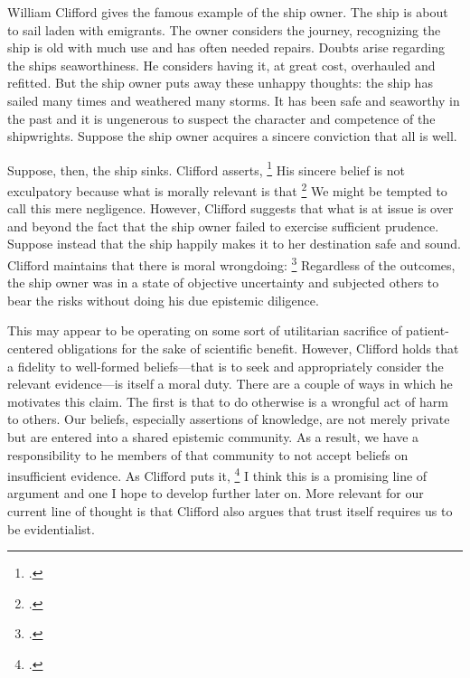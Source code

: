 \documentclass[letterpaper,notitlepage,12pt]{article}
\begin{document}
William Clifford gives the famous example of the ship owner.
The ship is about to sail laden with emigrants.
The owner considers the journey, recognizing the ship is old with much use and
has often needed repairs.
Doubts arise regarding the ships seaworthiness.
He considers having it, at great cost, overhauled and refitted.
But the ship owner puts away these unhappy thoughts: the ship has sailed many
times and weathered many storms.
It has been safe and seaworthy in the past and it is ungenerous to suspect the
character and competence of the shipwrights.
Suppose the ship owner acquires a sincere conviction that all is well.

Suppose, then, the ship sinks.
Clifford asserts, \footcite[p. 339]{clifford_ethics_1886}
His sincere belief is not exculpatory because what is morally relevant is that
\footcite[p. 340]{clifford_ethics_1886}
We might be tempted to call this mere negligence.
However, Clifford suggests that what is at issue is over and beyond the fact
that the ship owner failed to exercise sufficient prudence.
Suppose instead that the ship happily makes it to her destination safe and
sound.
Clifford maintains that there is moral wrongdoing: \footcite[p. 340]{clifford_ethics_1886}
Regardless of the outcomes, the ship owner was in a state of objective
uncertainty and subjected others to bear the risks without doing his due
epistemic diligence.

This may appear to be operating on some sort of utilitarian sacrifice of
patient-centered obligations for the sake of scientific benefit.
However, Clifford holds that a fidelity to well-formed beliefs---that is to seek
and appropriately consider the relevant evidence---is itself a moral duty.
There are a couple of ways in which he motivates this claim.
The first is that to do otherwise is a wrongful act of harm to others.
Our beliefs, especially assertions of knowledge, are not merely private but are
entered into a shared epistemic community.
As a result, we have a responsibility to he members of that community to not
accept beliefs on insufficient evidence.
As Clifford puts it, \footcite[p. 344]{clifford_ethics_1886}
I think this is a promising line of argument and one I hope to develop further
later on.
More relevant for our current line of thought is that Clifford also argues that
trust itself requires us to be evidentialist.
\end{document}
